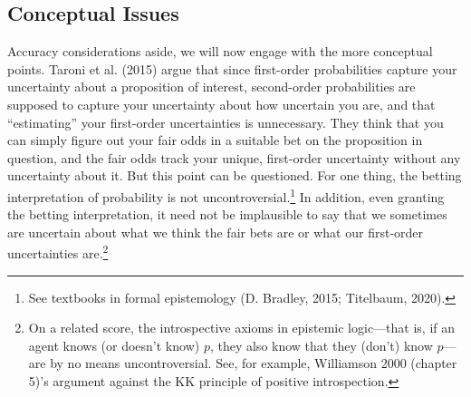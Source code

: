 \documentclass[
  10pt,
  dvipsnames,enabledeprecatedfontcommands]{scrartcl}
\begin{document}
\hypertarget{conceptual-issues}{%
\subsection{Conceptual Issues}\label{conceptual-issues}}

Accuracy considerations aside, we will now engage with the more
conceptual points. Taroni et al. (2015) argue that since first-order
probabilities capture your uncertainty about a proposition of interest,
second-order probabilities are supposed to capture your uncertainty
about how uncertain you are, and that ``estimating'' your first-order
uncertainties is unnecessary. They think that you can simply figure out
your fair odds in a suitable bet on the proposition in question, and the
fair odds track your unique, first-order uncertainty without any
uncertainty about it. But this point can be questioned. For one thing,
the betting interpretation of probability is not
uncontroversial.\footnote{See textbooks in formal epistemology (D.
  Bradley, 2015; Titelbaum, 2020).} In addition, even granting the
betting interpretation, it need not be implausible to say that we
sometimes are uncertain about what we think the fair bets are or what
our first-order uncertainties are.\footnote{On a related score, the
  introspective axioms in epistemic logic---that is, if an agent knows
  (or doesn't know) \(p\), they also know that they (don't) know
  \(p\)---are by no means uncontroversial. See, for example, Williamson
  2000 (chapter 5)'s argument against the KK principle of positive
  introspection.}
\end{document}
